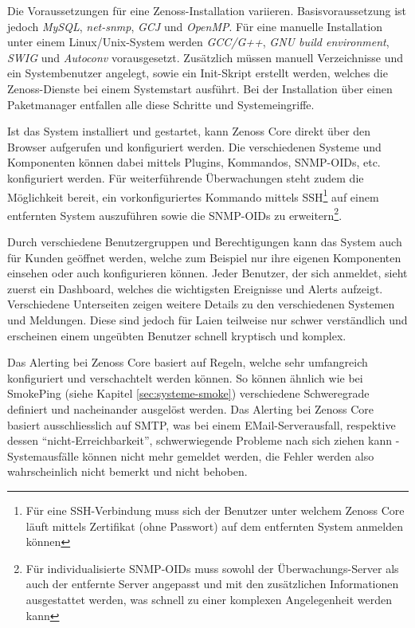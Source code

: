   Die Voraussetzungen f\"ur eine Zenoss-Installation variieren. Basisvoraussetzung ist jedoch \textit{MySQL}, \textit{net-snmp}, \textit{GCJ} und \textit{OpenMP}. F\"ur eine manuelle Installation unter einem Linux/Unix-System werden \textit{GCC/G++}, \textit{GNU build environment}, \textit{SWIG} und \textit{Autoconv} vorausgesetzt. Zus\"atzlich m\"ussen manuell Verzeichnisse und ein Systembenutzer angelegt, sowie ein Init-Skript erstellt werden, welches die Zenoss-Dienste bei einem Systemstart ausf\"uhrt. Bei der Installation \"uber einen Paketmanager entfallen alle diese Schritte und Systemeingriffe.

  Ist das System installiert und gestartet, kann Zenoss Core direkt \"uber den Browser aufgerufen und konfiguriert werden. Die verschiedenen Systeme und Komponenten k\"onnen dabei mittels Plugins, Kommandos, SNMP-OIDs, etc. konfiguriert werden. F\"ur weiterf\"uhrende \"Uberwachungen steht zudem die M\"oglichkeit bereit, ein vorkonfiguriertes Kommando mittels SSH\footnote{\label{foot:zenoss-ssh}F\"ur eine SSH-Verbindung muss sich der Benutzer unter welchem Zenoss Core l\"auft mittels Zertifikat (ohne Passwort) auf dem entfernten System anmelden k\"onnen} auf einem entfernten System auszuf\"uhren sowie die SNMP-OIDs zu erweitern\footnote{\label{foot:zenoss-snmp}F\"ur individualisierte SNMP-OIDs muss sowohl der \"Uberwachungs-Server als auch der entfernte Server angepasst und mit den zus\"atzlichen Informationen ausgestattet werden, was schnell zu einer komplexen Angelegenheit werden kann}.

  Durch verschiedene Benutzergruppen und Berechtigungen kann das System auch f\"ur Kunden ge\"offnet werden, welche zum Beispiel nur ihre eigenen Komponenten einsehen oder auch konfigurieren k\"onnen. Jeder Benutzer, der sich anmeldet, sieht zuerst ein Dashboard, welches die wichtigsten Ereignisse und Alerts aufzeigt. Verschiedene Unterseiten zeigen weitere Details zu den verschiedenen Systemen und Meldungen. Diese sind jedoch f\"ur Laien teilweise nur schwer verst\"andlich und erscheinen einem unge\"ubten Benutzer schnell kryptisch und komplex.

  Das Alerting bei Zenoss Core basiert auf Regeln, welche sehr umfangreich konfiguriert und verschachtelt werden k\"onnen. So k\"onnen \"ahnlich wie bei SmokePing (siehe Kapitel \ref{sec:systeme-smoke}) verschiedene Schweregrade definiert und nacheinander ausgel\"ost werden. Das Alerting bei Zenoss Core basiert ausschliesslich auf SMTP, was bei einem EMail-Serverausfall, respektive dessen "`nicht-Erreichbarkeit"', schwerwiegende Probleme nach sich ziehen kann - Systemausf\"alle k\"onnen nicht mehr gemeldet werden, die Fehler werden also wahrscheinlich nicht bemerkt und nicht behoben.

